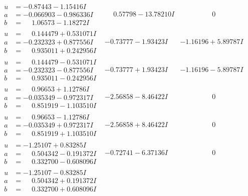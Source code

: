 \documentclass[1p]{elsarticle_modified}
\theoremstyle{definition}
\begin{document}
$$\begin{array}{c|c|c}
\begin{aligned}
u &= -0.87443 - 1.15416 I \\
a &= -0.066903 - 0.986336 I \\
b &= \phantom{-}1.06573 - 1.18272 I\end{aligned}
 & \phantom{-}0.57798 - 13.78210 I & \phantom{-0.000000 } 0 \\ \hline\begin{aligned}
u &= \phantom{-}0.144479 + 0.531071 I \\
a &= -0.232323 + 0.877556 I \\
b &= \phantom{-}0.935011 + 0.242956 I\end{aligned}
 & -0.73777 - 1.93423 I & -1.16196 + 5.89787 I \\ \hline\begin{aligned}
u &= \phantom{-}0.144479 - 0.531071 I \\
a &= -0.232323 - 0.877556 I \\
b &= \phantom{-}0.935011 - 0.242956 I\end{aligned}
 & -0.73777 + 1.93423 I & -1.16196 - 5.89787 I \\ \hline\begin{aligned}
u &= \phantom{-}0.96653 + 1.12786 I \\
a &= -0.035349 - 0.972317 I \\
b &= \phantom{-}0.851919 - 1.103510 I\end{aligned}
 & -2.56858 - 8.46422 I & \phantom{-0.000000 } 0 \\ \hline\begin{aligned}
u &= \phantom{-}0.96653 - 1.12786 I \\
a &= -0.035349 + 0.972317 I \\
b &= \phantom{-}0.851919 + 1.103510 I\end{aligned}
 & -2.56858 + 8.46422 I & \phantom{-0.000000 } 0 \\ \hline\begin{aligned}
u &= -1.25107 + 0.83285 I \\
a &= \phantom{-}0.504342 - 0.191372 I \\
b &= \phantom{-}0.332700 - 0.608096 I\end{aligned}
 & -0.72741 - 6.37136 I & \phantom{-0.000000 } 0 \\ \hline\begin{aligned}
u &= -1.25107 - 0.83285 I \\
a &= \phantom{-}0.504342 + 0.191372 I \\
b &= \phantom{-}0.332700 + 0.608096 I\end{aligned}

\end{array}$$
\end{document}
